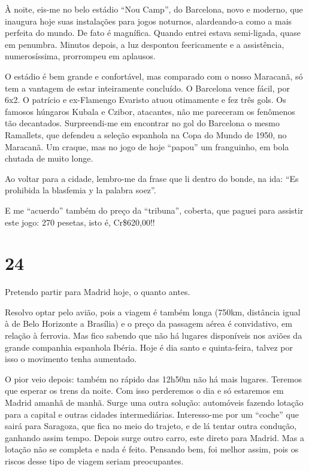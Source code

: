 À noite, eis-me no belo estádio ``Nou Camp'', do Barcelona, novo e moderno, que inaugura hoje suas instalações para jogos noturnos, alardeando-a como a mais perfeita do mundo. De fato é magnífica. Quando entrei estava semi-ligada, quase em penumbra. Minutos depois, a luz despontou feericamente e a assistência, numerosíssima, prorrompeu em aplausos.

O estádio é bem grande e confortável, mas comparado com o nosso Maracanã, só tem a vantagem de estar inteiramente concluído. O Barcelona vence fácil, por 6x2. O patrício e ex-Flamengo Evaristo atuou otimamente e fez três gols. Os famosos húngaros Kubala e Czibor, atacantes, não me pareceram os fenômenos tão decantados. Surpreendi-me em encontrar no gol do Barcelona o mesmo Ramallets, que defendeu a seleção espanhola na Copa do Mundo de 1950, no Maracanã. Um craque, mas no jogo de hoje ``papou'' um franguinho, em bola chutada de muito longe.

Ao voltar para a cidade, lembro-me da frase que li dentro do bonde, na ida: ``Es prohibida la blasfemia y la palabra soez''.

E me ``acuerdo'' também do preço da ``tribuna'', coberta, que paguei para assistir este jogo: 270 pesetas, isto é, Cr\$620,00!!

\section*{24 \adfflatleafright {}}
Pretendo partir para Madrid hoje, o quanto antes.

Resolvo optar pelo avião, pois a viagem é também longa (750km, distância igual à de Belo Horizonte a Brasília) e o preço da passagem aérea é convidativo, em relação à ferrovia. Mas fico sabendo que não há lugares disponíveis nos aviões da grande companhia espanhola Ibéria. Hoje é dia santo e quinta-feira, talvez por isso o movimento tenha aumentado.

O pior veio depois: também no rápido das 12h50m não há mais lugares. Teremos que esperar os trens da noite. Com isso perderemos o dia e só estaremos em Madrid amanhã de manhã. Surge uma outra solução: automóveis fazendo lotação para a capital e outras cidades intermediárias. Interesso-me por um ``coche'' que sairá para Saragoza, que fica no meio do trajeto, e de lá tentar outra condução, ganhando assim tempo. Depois surge outro carro, este direto para Madrid. Mas a lotação não se completa e nada é feito. Pensando bem, foi melhor assim, pois os riscos desse tipo de viagem seriam preocupantes.

